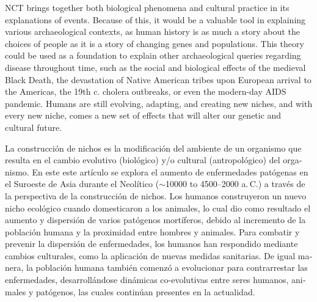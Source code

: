 NCT brings together both biological phenomena and cultural practice in its explanations of events. Because of this, it would be a valuable tool in explaining various archaeological contexts, as human history is as much a story about the choices of people as it is a story of changing genes and populations. This theory could be used as a foundation to explain other archaeological queries regarding disease throughout time, such as the social and biological effects of the medieval Black Death, the devastation of Native American tribes upon European arrival to the Americas, the 19th c. cholera outbreaks, or even the modern-day AIDS pandemic. Humans are still evolving, adapting, and creating new niches, and with every new niche, comes a new set of effects that will alter our genetic and cultural future.	
\myseparator
	\begin{myabstract}
\foreignlanguage{spanish}{
	La construcción de nichos es la modificación del ambiente de un organismo que resulta en el cambio evolutivo (biológico) y/o cultural (antropológico) del organismo. En este este artículo se explora el aumento de enfermedades patógenas en el Suroeste de Asia durante el Neolítico ($\sim$10000 to 4500--2000 a.\,C.) a través de la perspectiva de la construcción de nichos. Los humanos construyeron un nuevo nicho ecológico cuando domesticaron a los animales, lo cual dio como resultado el aumento y dispersión de varios patógenos mortíferos, debido al incremento de la población humana y la proximidad entre hombres y animales. Para combatir y prevenir la dispersión de enfermedades, los humanos han respondido mediante cambios culturales, como la aplicación de nuevas medidas sanitarias. De igual manera, la población humana también comenzó a evolucionar para contrarrestar las enfermedades, desarrollándose dinámicas co-evolutivas entre seres humanos, animales y patógenos, las cuales continúan presentes en la actualidad.}

		
	\end{myabstract}
	

\printbibliography[heading=subbibnumbered] 
\label{Scollan:lastpage}
\closingarticle
